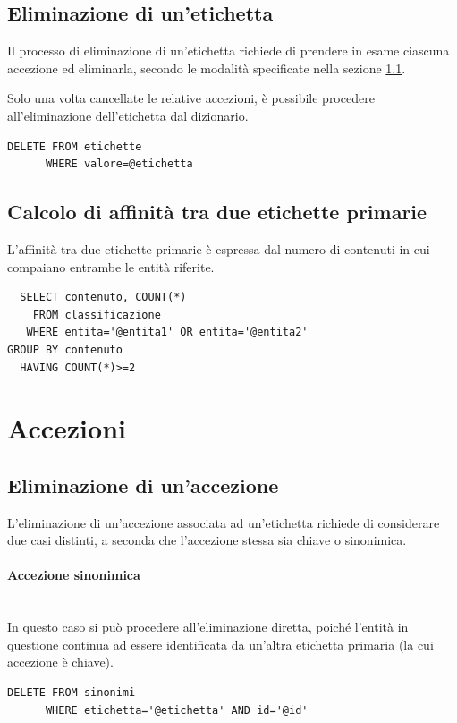 \documentclass[10pt,a4paper,headinclude,footinclude,hidelinks]{scrreprt} %
\begin{document}
	\subsection{Eliminazione di un'etichetta}
	Il processo di eliminazione di un'etichetta richiede di prendere in esame ciascuna accezione ed eliminarla, secondo le modalità specificate nella sezione \ref{ch:stage:er:operazioni:accezioni:eliminazione}.

	Solo una volta cancellate le relative accezioni, è possibile procedere all'eliminazione dell'etichetta dal dizionario.
\begin{verbatim}
DELETE FROM etichette
      WHERE valore=@etichetta
\end{verbatim}

	\subsection{Calcolo di affinità tra due etichette primarie}
	L'affinità tra due etichette primarie è espressa dal numero di contenuti in cui compaiano entrambe le entità riferite.
\begin{verbatim}
  SELECT contenuto, COUNT(*)
    FROM classificazione
   WHERE entita='@entita1' OR entita='@entita2'
GROUP BY contenuto
  HAVING COUNT(*)>=2
\end{verbatim}

	\section{Accezioni}
	\label{ch:stage:er:operazioni:accezioni}
	
	\subsection{Eliminazione di un'accezione}
	\label{ch:stage:er:operazioni:accezioni:eliminazione}
	L'eliminazione di un'accezione associata ad un'etichetta richiede di considerare due casi distinti, a seconda che l'accezione stessa sia chiave o sinonimica.

	\paragraph{Accezione sinonimica} \hfill \\
	In questo caso si può procedere all'eliminazione diretta, poiché l'entità in questione continua ad essere identificata da un'altra etichetta primaria (la cui accezione è chiave).
\begin{verbatim}
DELETE FROM sinonimi
      WHERE etichetta='@etichetta' AND id='@id'
\end{verbatim}
\end{document}
